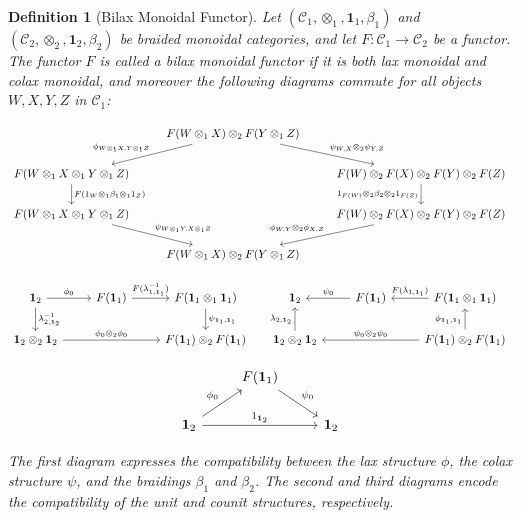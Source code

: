 \documentclass{amsart}
\newtheorem{definition}{Definition}[section]
\begin{document}
\begin{definition}[Bilax Monoidal Functor]\label{def:bilax}
Let $(\mathcal{C}_1, \otimes_1, \mathbf{1}_1, \beta_1)$ and $(\mathcal{C}_2, \otimes_2, \mathbf{1}_2, \beta_2)$ be braided monoidal categories, and let $F \colon \mathcal{C}_1 \longrightarrow \mathcal{C}_2$ be a functor. The functor $F$ is called a bilax monoidal functor if it is both lax monoidal and colax monoidal, and moreover the following diagrams commute for all objects $W, X, Y, Z$ in $\mathcal{C}_1$:

\[
\begin{tikzcd}
&F(W\otimes_1 X)\otimes_2F(Y\otimes_1 Z)\arrow[swap]{ld}{\phi_{W\otimes_1X,Y\otimes_1Z}}\arrow{rd}{\psi_{W,X}\otimes_2 \psi_{Y,Z}}&\\
F(W\otimes_1X\otimes_1Y\otimes_1Z)\arrow{d}{F(1_W\otimes_1\beta_1\otimes_11_Z)}&&F(W)\otimes_2F(X)\otimes_2F(Y)\otimes_2F(Z)\arrow[swap]{d}{1_{F(W)}\otimes_2\beta_2\otimes_21_{F(Z)}}\\
F(W\otimes_1X\otimes_1Y\otimes_1Z)\arrow{rd}{\psi_{W\otimes_1Y,X\otimes_1Z}}&&F(W)\otimes_2F(X)\otimes_2F(Y)\otimes_2F(Z)\arrow[swap]{ld}{\phi_{W,Y}\otimes_2\phi_{X,Z}}\\
&F(W\otimes_1 X)\otimes_2F(Y\otimes_1 Z)&
\end{tikzcd}
\label{eq:bilax_braiding}
\]

\[
\begin{tikzcd}
\mathbf{1}_2\arrow{d}{\lambda^{-1}_{2,\mathbf{1}_2}}\arrow{r}{\phi_0}&F(\mathbf{1}_1)\arrow{r}{F(\lambda^{-1}_{1,\mathbf{1}_1})}&F(\mathbf{1}_1\otimes_1\mathbf{1}_1)\arrow{d}{\psi_{\mathbf{1}_1,\mathbf{1}_1}}\\
\mathbf{1}_2\otimes_2\mathbf{1}_2\arrow{rr}{\phi_0\otimes_2\phi_0}&&F(\mathbf{1}_1)\otimes_2 F(\mathbf{1}_1)
\end{tikzcd}
\;\;\;\;\;
\begin{tikzcd}
\mathbf{1}_2&F(\mathbf{1}_1)\arrow[swap]{l}{\psi_0}&F(\mathbf{1}_1\otimes_1\mathbf{1}_1)\arrow[swap]{l}{F(\lambda_{1,\mathbf{1}_1})}\\
\mathbf{1}_2\otimes_2\mathbf{1}_2\arrow{u}{\lambda_{2,\mathbf{1}_2}}&&F(\mathbf{1}_1)\otimes_2 F(\mathbf{1}_1)\arrow[swap]{ll}{\psi_0\otimes_2\psi_0}\arrow{u}{\phi_{\mathbf{1}_1,\mathbf{1}_1}}
\end{tikzcd}
\label{eq:bilax_unit}
\]

\[
\begin{tikzcd}
&F(\mathbf{1}_1)\arrow{dr}{\psi_0}&\\
\mathbf{1}_2\arrow{ur}{\phi_0}\arrow{rr}{1_{\mathbf{1}_2}}&&\mathbf{1}_2
\end{tikzcd}
\label{eq:bilax_id}
\]

The first diagram expresses the compatibility between the lax structure $\phi$, the colax structure $\psi$, and the braidings $\beta_1$ and $\beta_2$. The second and third diagrams encode the compatibility of the unit and counit structures, respectively.
\end{definition}
\end{document}
